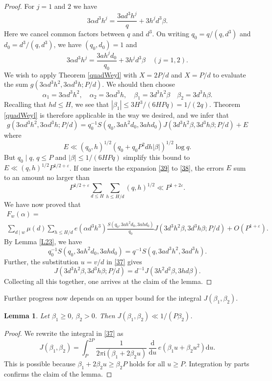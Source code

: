 \documentclass[reqno]{amsart}
\newcommand{\f}[2]{\frac{#1}{#2}}
\newcommand\dd{{\mathrm d}}
\newtheorem{lemma}[thm]{Lemma}
\numberwithin{equation}{section}
\begin{document}
\begin{proof}
For $j=1$ and $2$ we have
$$ 3\alpha d^3 h^j = \frac{3ad^3h^j}{q} + 3h^jd^3\beta. $$
Here we cancel  common factors between $q$ and $d^3$. On writing $q_0=q/(q,d^3)$ and $d_0=d^3/(q,d^3)$, we have $(q_0,d_0)=1$ and
$$    3\alpha d^3 h^j = \frac{3ah^jd_0}{q_0} + 3h^jd^3\beta \quad (j=1,2). $$
We wish to apply Theorem \ref{quadWeyl} with $X=2P/d$ and $X=P/d$ to evaluate the sum $g(3\alpha d^3h^2, 3\alpha d^3h; P/d)$. We should then choose 
$$\alpha_1= 
3\alpha d^3 h^2, \quad \alpha_2 =3\alpha d^3 h, \quad \beta_1=3 d^3 h^2 \beta\quad \beta_2 = 3 d^3 h\beta. $$
Recalling that $hd\le H$, we see that $|\beta_1|\le 3H^3/(6HPq)=1/(2q)$. Theorem \ref{quadWeyl} is therefore applicable in the way we desired, and we infer that
\begin{equation}\label{39} 
  g(3\alpha d^3h^2, 3\alpha d^3h; P/d) = q_0^{-1} S(q_0, 3ah^2d_0, 3ahd_0) J(3 d^3 h^2 \beta,3 d^3 h\beta;P/d) + E \end{equation}
where
$$ E \ll (q_0,h)^{1/2} (q_0 +q_0 P^2dh |\beta|)^{1/2} \log q. $$
But $q_0\mid q$,  $q \le P$ and $|\beta|\le 1/(6HPq)$ simplify this bound to
$ E\ll (q,h)^{1/2} P^{1/2+\varepsilon}$. If one inserts the expansion \eqref{39} to \eqref{38}, the errors $E$ sum to an amount no larger than
$$ P^{1/2+\varepsilon} \sum_{d\le H} \sum _{h\le H/d} (q,h)^{1/2} \ll P^{1+2\varepsilon}. $$
We have now proved that
\begin{multline*}F_w(\alpha) = \\
\sum_{d\mid w}\mu(d) \sum_{h\le H/d} e(\alpha d^3 h^3) \f{S(q_0, 3ah^2d_0, 3ahd_0)}{q_0}J(3 d^3 h^2 \beta,3 d^3 h\beta;P/d) +O(P^{1+\varepsilon}).\end{multline*}
By Lemma \ref{L23}, we have 
$$ q_0^{-1} S(q_0, 3ah^2d_0, 3ahd_0)= q^{-1} S(q,3ad^3h^2, 3ad^3h). $$
Further, the substitution $u=v/d$ in \eqref{37} gives 
$$ J(3 d^3 h^2 \beta,3 d^3 h\beta;P/d) = d^{-1} J(3h^2d^2\beta, 3hd\beta). $$
Collecting all this together, one arrives at the claim of the lemma.
\end{proof} 

Further progress now depends on an upper bound for the integral $J(\beta_1,\beta_2)$.

\begin{lemma}\label{LJ} Let $\beta_1\ge 0$, $\beta_2>0$. Then $J(\beta_1,\beta_2)\ll 1/(P\beta_2)$.
\end{lemma}

\begin{proof}
We rewrite the integral in \eqref{37} as
$$ J(\beta_1,\beta_2) = \int_P^{2P} \frac{1}{2\pi\mathrm i (\beta_1+2\beta_2 u)} \,\frac{\mathrm d}{\mathrm d u} \, e(\beta_1 u+\beta_2 u^2)\dd u. $$
This is possible because $\beta_1+2\beta_2 u \ge \beta_2 P$ holds for all $u\ge P$. Integration by parts confirms the claim of the lemma.
\end{proof}
\end{document}
